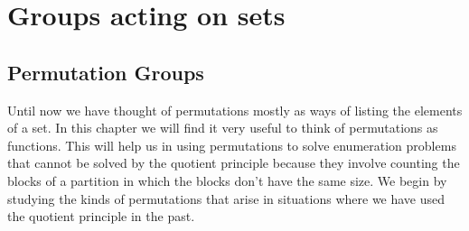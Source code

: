 \documentclass[10pt,]{book}
\theoremstyle{plain}
\theoremstyle{definition}
\theoremstyle{definition}
\numberwithin{equation}{chapter}
\begin{document}
\chapter[{Groups acting on sets}]{Groups acting on sets}\label{groupsonsets}
\typeout{************************************************}
\typeout{************************************************}
\section[{Permutation Groups}]{Permutation Groups}\label{sec_groups-permgroups}
Until now we have thought of permutations mostly as ways of listing the elements of a set. In this chapter we will find it very useful to think of permutations as functions. This will help us in using permutations to solve enumeration problems that cannot be solved by the quotient principle because they involve counting the blocks of a partition in which the blocks don't have the same size. We begin by studying the kinds of permutations that arise in situations where we have used the quotient principle in the past.%
\typeout{************************************************}
\typeout{************************************************}
\end{document}
